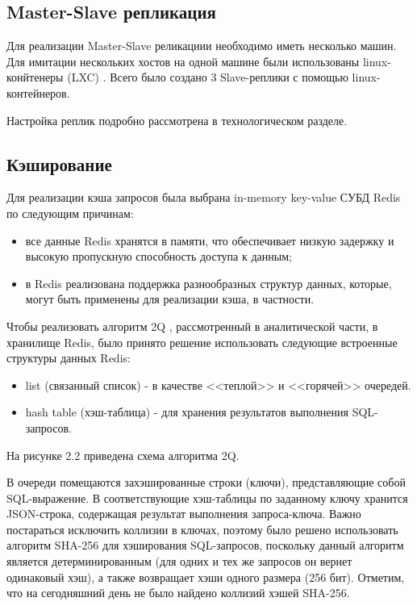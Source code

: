 \subsection{Master-Slave репликация}

Для реализации Master-Slave реликациии необходимо иметь несколько машин. Для имитации нескольких хостов на одной машине были использованы linux-конйтенеры (LXC) \cite{lxc}. Всего было создано 3 Slave-реплики с помощью linux-контейнеров.

Настройка реплик подробно рассмотрена в технологическом разделе.

\subsection{Кэширование}

Для реализации кэша запросов была выбрана in-memory key-value СУБД Redis по следующим причинам:
\begin{itemize}
	\item все данные Redis хранятся в памяти, что обеспечивает низкую задержку и высокую пропускную способность доступа к данным;
	\item в Redis реализована поддержка разнообразных структур данных, которые, могут быть применены для реализации кэша, в частности.
\end{itemize}

Чтобы реализовать алгоритм 2Q \cite{2q}, рассмотренный в аналитической части, в хранилище Redis, было принято решение использовать следующие встроенные структуры данных Redis:
\begin{itemize}
	\item list (связанный список) - в качестве <<теплой>> и <<горячей>> очередей.
	\item hash table (хэш-таблица) - для хранения результатов выполнения SQL-запросов.
\end{itemize}

На рисунке 2.2 приведена схема алгоритма 2Q.

В очереди помещаются захэшированные строки (ключи), представляющие собой SQL-выражение. В соответствующие хэш-таблицы по заданному ключу хранится JSON-строка, содержащая результат выполнения запроса-ключа. Важно постараться исключить коллизии в ключах, поэтому было решено использовать алгоритм SHA-256 \cite{sha256} для хэширования SQL-запросов, поскольку данный алгоритм является детерминированным (для одних и тех же запросов он вернет одинаковый хэш), а также возвращает хэши одного размера (256 бит). Отметим, что на сегодняшний день не было найдено коллизий хэшей SHA-256.

